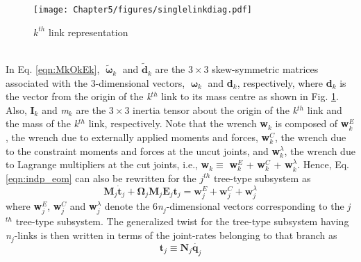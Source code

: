 \begin{figure}[t!]
	\begin{center}
		\texttt{[image: Chapter5/figures/singlelinkdiag.pdf]}
		\caption{$k^{th}$ link representation}
		\label{fig:c5singlelinkdiag} %
	\end{center}
\end{figure}
\\In Eq. \ref{eqn:MkOkEk}, $\bm{\tilde\upomega}_k$ and $\mathbf{\tilde d}_k$ are the $3\times3$ skew-symmetric matrices associated with the 3-dimensional vectors, $\bm{\upomega}_k$ and \textbf{d}$_k$, respectively, where \textbf{d}$_k$ is the vector from the origin of the \emph{k}$^{th}$ link to its mass centre as shown in Fig. \ref{fig:c5singlelinkdiag}. Also, \textbf{I}$_k$ and \textit{m}$_k$ are the $3\times3$ inertia tensor about the origin of the \textit{k}$^{th}$ link and the mass of the \textit{k}$^{th}$ link, respectively. Note that the wrench \textbf{w}$_k$ is composed of \textbf{w$_k^E$}, the wrench due to externally applied moments and forces, \textbf{w$_k^C$}, the wrench due to the constraint moments and forces at the uncut joints, and \textbf{w$_k^\lambda$}, the wrench due to Lagrange multipliers at the cut joints, i.e., \textbf{w}$_k \equiv$ \textbf{w$_k^E$} + \textbf{w$_k^C$} + \textbf{w$_k^\lambda$}. Hence, Eq. \ref{eqn:indp_eom} can also be rewritten for the $j^{th}$ tree-type subsystem as
\begin{equation}
\label{eqn:uncons_eom}
\textbf{M}_j\dot{\textbf{t}}_j + \mathbf{\Omega}_j\textbf{M}_j\textbf{E}_j\textbf{t}_j = \textbf{w}^E_j + 
\textbf{w}^C_j + \textbf{w}_j^\lambda
\end{equation}
where \textbf{w$^E_j$}, \textbf{w$^C_j$} and \textbf{w$^\lambda_j$} denote the 6\textit{n}$_j$-dimensional vectors corresponding to the \emph{j}$^{th}$ tree-type subsystem. The generalized twist for the tree-type subsystem having \emph{n}$_j$-links is then written in terms of the joint-rates belonging to that branch as
\begin{equation}
\label{eqn:twist}
\textbf{t}_j \equiv \textbf{N}_j\dot{\textbf{q}_j}
\end{equation}
